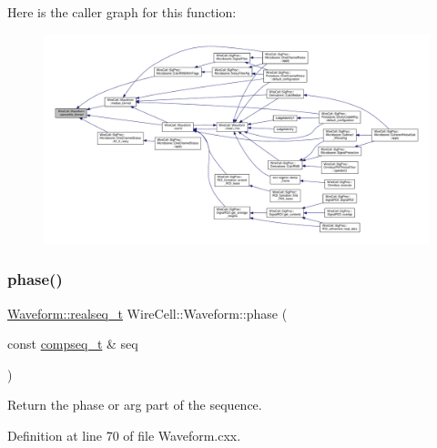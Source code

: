 Here is the caller graph for this function\+:
\nopagebreak
\begin{figure}[H]
\begin{center}
\leavevmode
\includegraphics[width=350pt]{namespace_wire_cell_1_1_waveform_ae080d239c8b4426a6d74f9fd8ce85f1a_icgraph}
\end{center}
\end{figure}
\mbox{\label{namespace_wire_cell_1_1_waveform_abcab023facead1d0eb14e2042ce578bb}} 
\subsubsection{\texorpdfstring{phase()}{phase()}}
{\footnotesize\ttfamily \hyperlink{namespace_wire_cell_1_1_waveform_a479175e541c8545e87cd8063b74b6956}{Waveform\+::realseq\+\_\+t} Wire\+Cell\+::\+Waveform\+::phase (\begin{DoxyParamCaption}\item[{const \hyperlink{namespace_wire_cell_1_1_waveform_a7e4a8d371f774438bb360e7d1dcb583a}{compseq\+\_\+t} \&}]{seq }\end{DoxyParamCaption})}



Return the phase or arg part of the sequence. 



Definition at line 70 of file Waveform.\+cxx.

